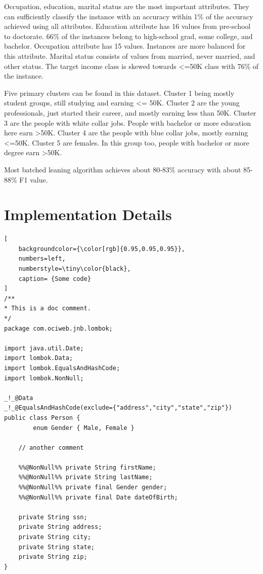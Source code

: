 Occupation, education, marital status are the most important attributes. They can sufficiently classify the instance with an accuracy within 1\% of the accuracy achieved using all attributes. Education attribute has 16 values from pre-school to doctorate. 66\% of the instances belong to high-school grad, some college, and bachelor. Occupation attribute has 15 values. Instances are  more balanced for this attribute. Marital status consists of values from married, never married, and other status. The target income class is skewed towards <=50K class with 76\% of the instance.

Five primary clusters can be found in this dataset. Cluster 1 being mostly student groups, still studying and earning <= 50K. Cluster 2 are the young professionals, just started their career, and mostly earning less than 50K. Cluster 3 are the people with white collar jobs. People with bachelor or more education here earn >50K. Cluster 4 are the people with blue collar jobs, mostly earning <=50K. Cluster 5 are females. In this group too, people with bachelor or more degree earn >50K.

Most batched leaning algorithm achieves about 80-83\% accuracy with about 85-88\% F1 value.

\chapter{Implementation Details}

\begin{lstlisting}[
    backgroundcolor={\color[rgb]{0.95,0.95,0.95}},
    numbers=left,
    numberstyle=\tiny\color{black},
    caption= {Some code}
]
/**
* This is a doc comment.
*/
package com.ociweb.jnb.lombok;

import java.util.Date;
import lombok.Data;
import lombok.EqualsAndHashCode;
import lombok.NonNull;

_!_@Data 
_!_@EqualsAndHashCode(exclude={"address","city","state","zip"})
public class Person {
        enum Gender { Male, Female }

    // another comment

    %%@NonNull%% private String firstName;
    %%@NonNull%% private String lastName;
    %%@NonNull%% private final Gender gender;
    %%@NonNull%% private final Date dateOfBirth;
    
    private String ssn;
    private String address;
    private String city;
    private String state;
    private String zip;
}
\end{lstlisting}